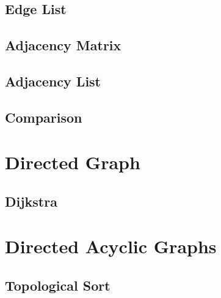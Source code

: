 \documentclass[12pt,a4paper]{article}
\begin{document}
\subsection{Edge List}
\subsection{Adjacency Matrix}
\subsection{Adjacency List}

\subsection{Comparison}

\section{Directed Graph}

\subsection{Dijkstra}

\section{Directed Acyclic Graphs}
\subsection{Topological Sort}
\end{document}
